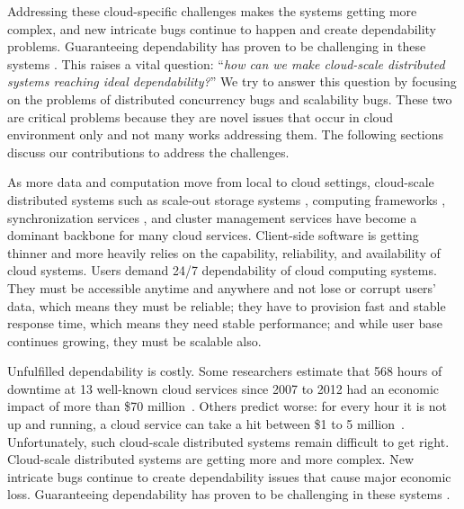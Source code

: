 
Addressing these cloud-specific challenges makes the systems getting more
complex, and new intricate bugs continue to happen and create dependability
problems. Guaranteeing dependability has proven to be challenging in these
systems \cite{Gunawi+11-FateDestini, Guo+11-Demeter, Wang+14-Exalt,
Yang+09-Modist}. This raises a vital question: ``{\em how can we make
cloud-scale distributed systems reaching ideal dependability?}'' We try to
answer this question by focusing on the problems of distributed concurrency bugs
and scalability bugs. These two are critical problems because they are novel
issues that occur in cloud environment only and not many works addressing them.
The following sections discuss our contributions to address the challenges.


As more data and computation move from local to cloud settings, cloud-scale
distributed systems such as scale-out storage systems \cite{Chang+06-BigTable,
DeCandia+07-Dynamo, Ghemawat+03-GoogleFS, Nightingale+12-FlatFDS}, computing
frameworks \cite{DeanGhemawat04-MapReduce, Murray+13-NaiadTimelyDataflow},
synchronization services \cite{Burrows06-Chubby, Hunt+10-ZooKeeperPaper}, and
cluster management services \cite{Hindman+11-Mesos, Kumar+13-Yarn} have become a
dominant backbone for many cloud services. Client-side software is getting
thinner and more heavily relies on the capability, reliability, and availability
of cloud systems. Users demand 24/7 dependability of cloud computing systems.
They must be accessible anytime and anywhere and not lose or corrupt users'
data, which means they must be reliable; they have to provision fast and stable
response time, which means they need stable performance; and while user base
continues growing, they must be scalable also.

Unfulfilled dependability is costly. Some researchers estimate that 568 hours of
downtime at 13 well-known cloud services since 2007 to 2012 had an economic
impact of more than \$70 million~\cite{Essers12-70Million}. Others predict
worse: for every hour it is not up and running, a cloud service can take a hit
between \$1 to 5 million~\cite{Linthicum13-InfoworldCostOutages}.
Unfortunately, such cloud-scale distributed systems remain difficult to get
right. 
%
Cloud-scale distributed systems are getting more and more complex. New intricate
bugs continue to create dependability issues that cause major economic loss.
Guaranteeing dependability has proven to be challenging in these systems
\cite{Gunawi+11-FateDestini, Guo+11-Demeter, Wang+14-Exalt, Yang+09-Modist}.

